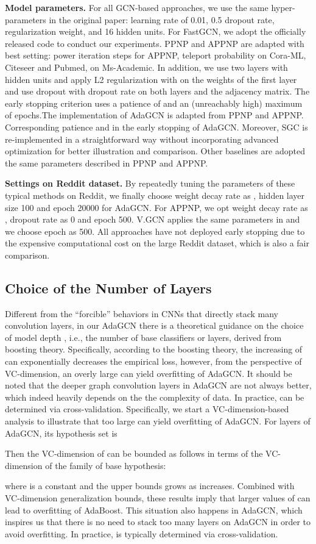 \documentclass{article} \usepackage{iclr2021_conference,times}
\begin{document}
\textbf{Model parameters.} For all GCN-based approaches, we use the same hyper-parameters in the original paper: learning rate of 0.01, 0.5 dropout rate,  regularization weight, and 16 hidden units. For FastGCN, we adopt the officially released code to conduct our experiments. PPNP and APPNP are adapted with best setting:  power iteration steps for APPNP, teleport probability  on Cora-ML, Citeseer and Pubmed,  on Ms-Academic. In addition, we use two layers
with  hidden units and apply L2 regularization with  on the weights of the first layer and use dropout with dropout rate  on both layers and the adjacency matrix. The early stopping criterion uses a patience of  and an (unreachably high) maximum of  epochs.The implementation of AdaGCN is adapted from PPNP and APPNP. Corresponding patience  and  in the early stopping of AdaGCN. Moreover, SGC is re-implemented in a straightforward way without incorporating advanced optimization for better illustration and comparison. Other baselines are adopted the same parameters described in PPNP and APPNP.

\textbf{Settings on Reddit dataset.} By repeatedly tuning the parameters of these typical methods on Reddit, we finally choose weight decay rate as , hidden layer size 100 and epoch 20000 for AdaGCN. For APPNP, we opt weight decay rate as , dropout rate as 0 and epoch 500. V.GCN applies the same parameters in \citep{kipf2016semi} and we choose epoch as 500. All approaches have not deployed early stopping due to the expensive computational cost on the large Reddit dataset, which is also a fair comparison.

\subsection{Choice of the Number of Layers} \label{sec:vc_dimension}
Different from the ``forcible'' behaviors in CNNs that directly stack many convolution layers, in our AdaGCN there is a theoretical guidance on the choice of model depth , i.e., the number of base classifiers or layers, derived from boosting theory. Specifically, according to the boosting theory, the increasing of  can exponentially decreases the empirical loss, however, from the perspective of VC-dimension, an overly large  can yield overfitting of AdaGCN. It should be noted that the deeper graph convolution layers in AdaGCN are not always better, which indeed heavily depends on the the complexity of data. In practice,  can be determined via cross-validation. Specifically, we start a VC-dimension-based analysis to illustrate that too large  can yield overfitting of AdaGCN. For  layers of AdaGCN, its hypothesis set is

Then the VC-dimension of  can be bounded as follows in terms of the VC-dimension  of the family of base hypothesis:

where  is a constant and the upper bounds grows as  increases. Combined with VC-dimension generalization bounds, these results imply that larger values of  can lead to overfitting of AdaBoost. This situation also happens in AdaGCN, which inspires us that there is no need to stack too many layers on AdaGCN in order to avoid overfitting. In practice,  is typically determined via cross-validation.
\end{document}
